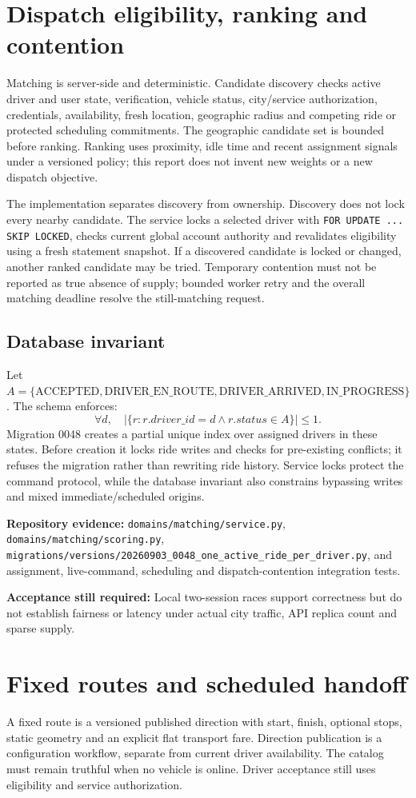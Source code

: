 \documentclass[11pt,a4paper]{article}
\newcommand{\src}[1]{{\small\nolinkurl{#1}}}
\newcommand{\evidence}[1]{\par\textbf{Repository evidence:} #1\par}
\newcommand{\gate}[1]{\par\textbf{Acceptance still required:} #1\par}
\begin{document}
\section{Dispatch eligibility, ranking and contention}
Matching is server-side and deterministic. Candidate discovery checks active
driver and user state, verification, vehicle status, city/service authorization,
credentials, availability, fresh location, geographic radius and competing ride
or protected scheduling commitments. The geographic candidate set is bounded
before ranking. Ranking uses proximity, idle time and recent assignment signals
under a versioned policy; this report does not invent new weights or a new
dispatch objective.

The implementation separates discovery from ownership. Discovery does not lock
every nearby candidate. The service locks a selected driver with
\src{FOR UPDATE ... SKIP LOCKED}, checks current global account authority and
revalidates eligibility using a fresh statement snapshot. If a discovered
candidate is locked or changed, another ranked candidate may be tried. Temporary
contention must not be reported as true absence of supply; bounded worker retry
and the overall matching deadline resolve the still-matching request.

\subsection{Database invariant}
Let $A=\{\text{ACCEPTED},\text{DRIVER\_EN\_ROUTE},
\text{DRIVER\_ARRIVED},\text{IN\_PROGRESS}\}$. The schema enforces:
\[
 \forall d,\quad \left|\{r:r.driver\_id=d\land r.status\in A\}\right|\leq 1.
\]
Migration 0048 creates a partial unique index over assigned drivers in these
states. Before creation it locks ride writes and checks for pre-existing
conflicts; it refuses the migration rather than rewriting ride history. Service
locks protect the command protocol, while the database invariant also constrains
bypassing writes and mixed immediate/scheduled origins.

\evidence{\src{domains/matching/service.py}, \src{domains/matching/scoring.py},
\src{migrations/versions/20260903_0048_one_active_ride_per_driver.py}, and assignment,
live-command, scheduling and dispatch-contention integration tests.}
\gate{Local two-session races support correctness but do not establish fairness
or latency under actual city traffic, API replica count and sparse supply.}

\section{Fixed routes and scheduled handoff}
A fixed route is a versioned published direction with start, finish, optional
stops, static geometry and an explicit flat transport fare. Direction publication
is a configuration workflow, separate from current driver availability. The
catalog must remain truthful when no vehicle is online. Driver acceptance still
uses eligibility and service authorization.
\end{document}
